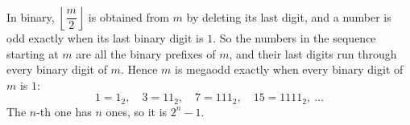 In binary, $\left\lfloor\dfrac m2\right\rfloor$ is obtained from $m$ by deleting its last digit, and a number is odd exactly when its last binary digit is $1$. So the numbers in the sequence starting at $m$ are all the binary prefixes of $m$, and their last digits run through every binary digit of $m$. Hence $m$ is megaodd exactly when every binary digit of $m$ is $1$:
\[1=1_2,\quad3=11_2,\quad7=111_2,\quad15=1111_2,\ \ldots\]
The $n$-th one has $n$ ones, so it is $\boxed{2^n-1}$.
